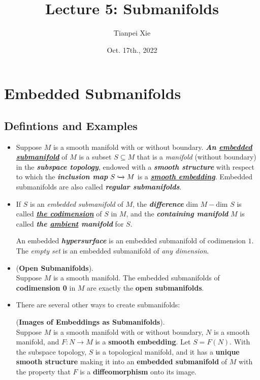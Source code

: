 \documentclass[11pt]{article}
\begin{document}
\title{Lecture 5: Submanifolds}
\author{ Tianpei Xie}
\date{Oct. 17th., 2022}
\maketitle
\tableofcontents
\newpage
\section{Embedded Submanifolds}
\subsection{Defintions and Examples}
\begin{itemize}
\item \begin{definition}
Suppose $M$ is a smooth manifold with or without boundary. \emph{\textbf{An \underline{embedded} \underline{submanifold}}} of $M$ is a subset $S \subseteq M$ that is a \emph{manifold} (without boundary) in the \emph{\textbf{subspace topology}}, endowed with a \emph{\textbf{smooth structure}} with respect to which the \emph{\textbf{inclusion map}} $S \xhookrightarrow{} M$ is a \underline{\emph{\textbf{smooth embedding}}}. Embedded submanifolds are also called \emph{\textbf{regular submanifolds}}.
\end{definition}

\item \begin{definition}
If $S$ is an \emph{embedded submanifold} of $M$, the \emph{\textbf{difference}} $\text{dim }M - \text{dim }S$ is called
\underline{\emph{\textbf{the codimension}}} of $S$ in $M$, and the \emph{\textbf{containing manifold}} $M$ is called \emph{\textbf{the \underline{ambient} manifold}} for $S$. 

An embedded \emph{\textbf{hypersurface}} is an embedded submanifold of codimension $1$. The \emph{empty set} is an embedded submanifold of \emph{any dimension}.
\end{definition}

\item \begin{proposition}(\textbf{Open Submanifolds}). \citep{lee2003introduction}\\
Suppose $M$ is a smooth manifold. The embedded submanifolds of \textbf{codimension 0} in $M$ are exactly the \textbf{open submanifolds}.
\end{proposition}

\item There are several other ways to create submanifolds:
\begin{proposition} (\textbf{Images of Embeddings as Submanifolds}). \citep{lee2003introduction} \\
Suppose $M$ is a smooth manifold with or without boundary, $N$ is a smooth manifold, and $F: N \rightarrow M$ is a \textbf{smooth embedding}. Let $S = F(N)$. With the subspace topology, $S$ is a topological manifold, and it has a \textbf{unique smooth structure} making it into an \textbf{embedded submanifold} of $M$ with the property that $F$ is a \textbf{diffeomorphism} onto its image.
\end{proposition}


\end{itemize}
\end{document}
